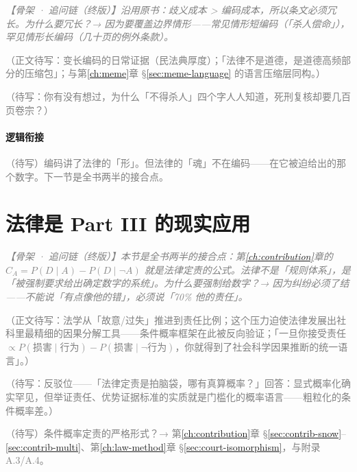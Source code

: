 \documentclass[../../main2.tex]{subfiles}
\begin{document}
	\textcolor{gray}{\textit{【骨架 · 追问链（终版）】沿用原书：歧义成本 > 编码成本，所以条文必须冗长。为什么要冗长？→ 因为要覆盖边界情形——常见情形短编码（「杀人偿命」），罕见情形长编码（几十页的例外条款）。}}

	\textcolor{gray}{（正文待写：变长编码的日常证据（民法典厚度）；「法律不是道德，是道德高频部分的压缩包」；与第\ref{ch:meme}章 §\ref{sec:meme-language} 的语言压缩层同构。）}

	\begin{readingnote}
		\textcolor{gray}{（待写：你有没有想过，为什么「不得杀人」四个字人人知道，死刑复核却要几百页卷宗？）}
	\end{readingnote}

	\paragraph*{逻辑衔接}
	\textcolor{gray}{（待写）编码讲了法律的「形」。但法律的「魂」不在编码——在它被迫给出的那个数字。下一节是全书两半的接合点。}

	\section{法律是 Part III 的现实应用}
	\label{sec:law-quantitative}

	\textcolor{gray}{\textit{【骨架 · 追问链（终版）】本节是全书两半的接合点：第\ref{ch:contribution}章的 $C_A = P(D \mid A) - P(D \mid \neg A)$ 就是法律定责的公式。法律不是「规则体系」，是「被强制要求给出确定数字的系统」。为什么要强制给数字？→ 因为纠纷必须了结——不能说「有点像他的错」，必须说「70\% 他的责任」。}}

	\textcolor{gray}{（正文待写：法学从「故意/过失」推进到责任比例；这个压力迫使法律发展出社科里最精细的因果分解工具——条件概率框架在此被反向验证；「一旦你接受责任 $\propto P(\text{损害} \mid \text{行为}) - P(\text{损害} \mid \neg \text{行为})$，你就得到了社会科学因果推断的统一语言」。）}

	\begin{questionbox}
		\textcolor{gray}{（待写：反驳位——「法律定责是拍脑袋，哪有真算概率？」回答：显式概率化确实罕见，但举证责任、优势证据标准的实质就是门槛化的概率语言——粗粒化的条件概率差。）}
	\end{questionbox}

	\begin{reader_anticipation}
		\item \textcolor{gray}{（待写）条件概率定责的严格形式？→ 第\ref{ch:contribution}章 §\ref{sec:contrib-snow}--\ref{sec:contrib-multi}、第\ref{ch:law-method}章 §\ref{sec:court-isomorphism}，与附录 A.3/A.4。}
	\end{reader_anticipation}
\end{document}
